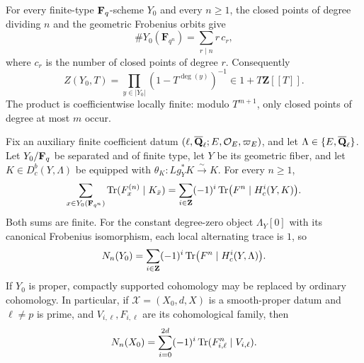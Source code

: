 
\begin{proposition}
\label{prop:euler-product}
\leanok


For every finite-type \(\mathbf F_q\)-scheme \(Y_0\) and every \(n\geq1\), the
closed points of degree dividing \(n\) and the geometric Frobenius orbits give
\[
 \#Y_0(\mathbf F_{q^n})
 =\sum_{r\mid n}r\,c_r,
\]
where \(c_r\) is the number of closed points of degree \(r\).  Consequently
\[
 Z(Y_0,T)
 =\prod_{y\in|Y_0|}(1-T^{\deg(y)})^{-1}
 \in1+T\mathbf Z[[T]].
\]
The product is coefficientwise locally finite: modulo \(T^{m+1}\), only
closed points of degree at most \(m\) occur.
\end{proposition}



\begin{proposition}
\label{prop:every-iterate-trace}


Fix an auxiliary finite coefficient datum
\((\ell,\overline{\mathbf Q}_\ell;E,\mathcal O_E,\varpi_E)\), and let
\(\Lambda\in\{E,\overline{\mathbf Q}_\ell\}\).  Let \(Y_0/\mathbf F_q\) be separated and of finite
type, let \(Y\) be its geometric fiber, and let
\(K\in D^b_c(Y,\Lambda)\) be equipped with
\(\theta_K:Lg_Y^*K\xrightarrow{\sim}K\).  For every \(n\geq1\),
\[
 \sum_{x\in Y_0(\mathbf F_{q^n})}
 \operatorname{Tr}(F_x^{(n)}\mid K_{\bar x})
 =\sum_{i\in\mathbf Z}(-1)^i
 \operatorname{Tr}\bigl(F^n\mid H_c^i(Y,K)\bigr).
\]
Both sums are finite.  For the constant degree-zero object
\(\Lambda_Y[0]\) with
its canonical Frobenius isomorphism, each local
alternating trace is \(1\), so
\[
 N_n(Y_0)=\sum_{i\in\mathbf Z}(-1)^i
 \operatorname{Tr}\bigl(F^n\mid H_c^i(Y,\Lambda)\bigr).
\]
If \(Y_0\) is proper, compactly supported cohomology may be replaced by
ordinary cohomology.  In particular, if
\(\mathscr X=(X_0,d,X)\) is a smooth-proper datum and
\(\ell\neq p\) is prime, and \(V_{i,\ell},F_{i,\ell}\) are its cohomological family,
then
\[
 N_n(X_0)=\sum_{i=0}^{2d}(-1)^i
 \operatorname{Tr}(F_{i,\ell}^n\mid V_{i,\ell}).
\]
\end{proposition}

